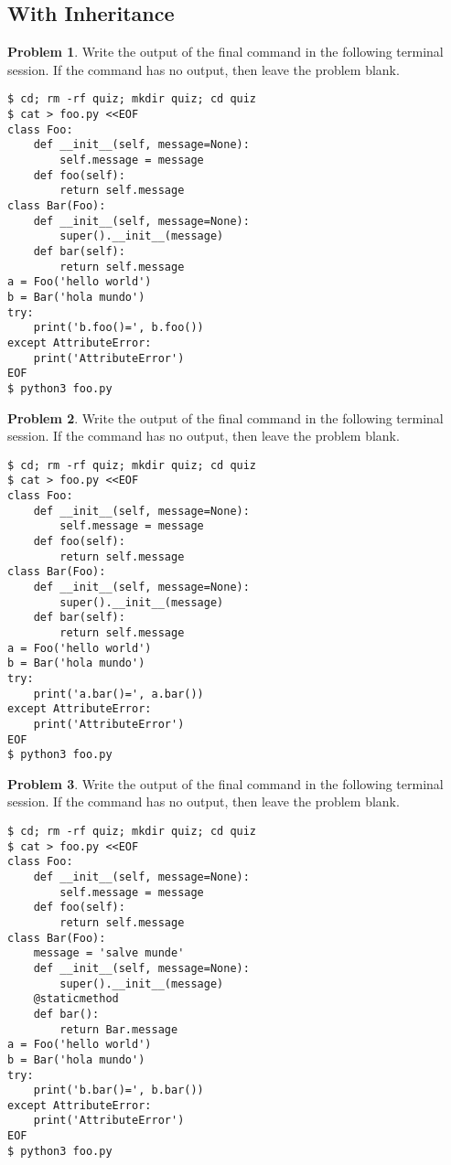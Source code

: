 \documentclass[10pt]{article}
\theoremstyle{definition}
\newtheorem{problem}{Problem}
\begin{document}
\subsection{With Inheritance}

\filbreak
\begin{problem}
    Write the output of the final command in the following terminal session.
    If the command has no output, then leave the problem blank.
\end{problem}
\begin{lstlisting}
$ cd; rm -rf quiz; mkdir quiz; cd quiz
$ cat > foo.py <<EOF
class Foo:
    def __init__(self, message=None):
        self.message = message
    def foo(self):
        return self.message
class Bar(Foo):
    def __init__(self, message=None):
        super().__init__(message)
    def bar(self):
        return self.message
a = Foo('hello world')
b = Bar('hola mundo')
try:
    print('b.foo()=', b.foo())
except AttributeError:
    print('AttributeError') 
EOF
$ python3 foo.py
\end{lstlisting}


\filbreak
\begin{problem}
    Write the output of the final command in the following terminal session.
    If the command has no output, then leave the problem blank.
\end{problem}
\begin{lstlisting}
$ cd; rm -rf quiz; mkdir quiz; cd quiz
$ cat > foo.py <<EOF
class Foo:
    def __init__(self, message=None):
        self.message = message
    def foo(self):
        return self.message
class Bar(Foo):
    def __init__(self, message=None):
        super().__init__(message)
    def bar(self):
        return self.message
a = Foo('hello world')
b = Bar('hola mundo')
try:
    print('a.bar()=', a.bar())
except AttributeError:
    print('AttributeError') 
EOF
$ python3 foo.py
\end{lstlisting}


\filbreak
\begin{problem}
    Write the output of the final command in the following terminal session.
    If the command has no output, then leave the problem blank.
\end{problem}
\begin{lstlisting}
$ cd; rm -rf quiz; mkdir quiz; cd quiz
$ cat > foo.py <<EOF
class Foo:
    def __init__(self, message=None):
        self.message = message
    def foo(self):
        return self.message
class Bar(Foo):
    message = 'salve munde'
    def __init__(self, message=None):
        super().__init__(message)
    @staticmethod
    def bar():
        return Bar.message
a = Foo('hello world')
b = Bar('hola mundo')
try:
    print('b.bar()=', b.bar())
except AttributeError:
    print('AttributeError') 
EOF
$ python3 foo.py
\end{lstlisting}
\end{document}
